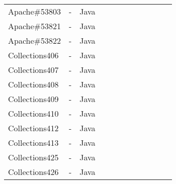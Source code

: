\begin{table*}
\begin{tabular}{lcccc|cccc|ccc}
Apache\#53803     &  -  & Java  &  &              &    &                                 &                   &                           &                        &   &        \\
Apache\#53821     &  -  & Java  &  &              &    &                                 &                   &                           &                        &   &        \\
Apache\#53822     &  -  & Java  &  &              &    &                                 &                   &                           &                        &   &        \\
\midrule
Collections406    &  -  & Java  &  &              &    &                                 &                   &                           &                        &   &        \\
Collections407    &  -  & Java  &  &              &    &                                 &                   &                           &                        &   &        \\
Collections408    &  -  & Java  &  &              &    &                                 &                   &                           &                        &   &        \\
Collections409    &  -  & Java  &  &              &    &                                 &                   &                           &                        &   &        \\
Collections410    &  - & Java  &  &              &    &                                 &                   &                           &                        &   &        \\
Collections412    &  -  & Java  &  &              &    &                                 &                   &                           &                        &   &        \\
Collections413    &  -  & Java  &  &              &    &                                 &                   &                           &                        &   &        \\
Collections425    &  -  & Java  &  &              &    &                                 &                   &                           &                        &   &        \\
Collections426    &  -  & Java  &  &              &    &                                 &                   &                           &                        &   &        \\

\end{tabular}
\end{table*}
